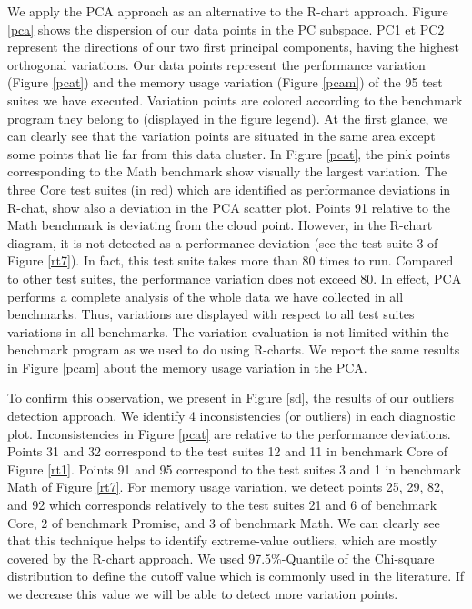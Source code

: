 We apply the PCA approach as an alternative to the R-chart approach. Figure \ref{pca} shows the dispersion of our data points in the PC subspace. PC1 et PC2 represent the directions of our two first principal components, having the highest orthogonal variations. Our data points represent the performance variation (Figure \ref{pcat}) and the memory usage variation (Figure \ref{pcam}) of the 95 test suites we have executed. Variation points are colored according to the benchmark program they belong to (displayed in the figure legend). At the first glance, we can clearly see that the variation points are situated in the same area except some points that lie far from this data cluster. In Figure \ref{pcat}, the pink points corresponding to the Math benchmark show visually the largest variation. The three Core test suites (in red) which are identified as performance deviations in R-chat, show also a deviation in the PCA scatter plot. Points 91 relative to the Math benchmark is deviating from the cloud point. However, in the R-chart diagram, it is not detected as a performance deviation (see the test suite 3 of Figure \ref{rt7}). In fact, this test suite takes more than 80 times to run. Compared to other test suites, the performance variation does not exceed 80. In effect, PCA performs a complete analysis of the whole data we have collected in all benchmarks. Thus, variations are displayed with respect to all test suites variations in all benchmarks. The variation evaluation is not limited within the benchmark program as we used to do using R-charts. We report the same results in Figure \ref{pcam} about the memory usage variation in the PCA. 


To confirm this observation, we present in Figure \ref{sd}, the results of our outliers detection approach. We identify 4 inconsistencies (or outliers) in each diagnostic plot. Inconsistencies in Figure \ref{pcat} are relative to the performance deviations. Points 31 and 32 correspond to the test suites 12 and 11 in benchmark Core of Figure \ref{rt1}. Points 91 and 95 correspond to the test suites 3 and 1 in benchmark Math of Figure \ref{rt7}. For memory usage variation, we detect points 25, 29, 82, and 92 which corresponds relatively to the test suites 21 and 6 of benchmark Core, 2 of benchmark Promise, and 3 of benchmark Math.
We can clearly see that this technique helps to identify extreme-value outliers, which are mostly covered by the R-chart approach. We used 97.5\%-Quantile of the Chi-square distribution to define the cutoff value which is commonly used in the literature\cite{enot2008preprocessing,hubert2009robust}. If we decrease this value we will be able to detect more variation points. 



